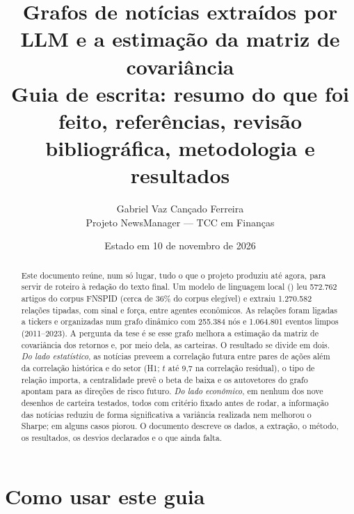 \documentclass[11pt,a4paper]{article}
\title{Grafos de notícias extraídos por LLM e a estimação da matriz de covariância\\[4pt]
\large Guia de escrita: resumo do que foi feito, referências, revisão bibliográfica, metodologia e resultados}
\author{Gabriel Vaz Cançado Ferreira\\\small Projeto NewsManager --- TCC em Finanças}
\date{Estado em 10 de novembro de 2026}
\begin{document}
\maketitle

\begin{abstract}
\noindent Este documento reúne, num só lugar, tudo o que o projeto produziu até agora, para servir de
roteiro à redação do texto final. Um modelo de linguagem local () leu
572.762 artigos do corpus FNSPID (cerca de 36\% do corpus elegível) e extraiu 1.270.582 relações
tipadas, com sinal e força, entre agentes econômicos. As relações foram ligadas a tickers e
organizadas num grafo dinâmico com 255.384 nós e 1.064.801 eventos limpos (2011--2023). A pergunta
da tese é se esse grafo melhora a estimação da matriz de covariância dos retornos e, por meio dela,
as carteiras. O resultado se divide em dois. \emph{Do lado estatístico}, as notícias preveem a correlação
futura entre pares de ações além da correlação histórica e do setor (H1; $t$ até 9,7 na correlação
residual), o tipo de relação importa, a centralidade prevê o beta de baixa e os autovetores do grafo
apontam para as direções de risco futuro. \emph{Do lado econômico}, em nenhum dos nove desenhos de
carteira testados, todos com critério fixado antes de rodar, a informação das notícias reduziu de
forma significativa a variância realizada nem melhorou o Sharpe; em alguns casos piorou. O documento
descreve os dados, a extração, o método, os resultados, os desvios declarados e o que ainda falta.
\end{abstract}

\tableofcontents
\newpage

\section{Como usar este guia}
\end{document}
